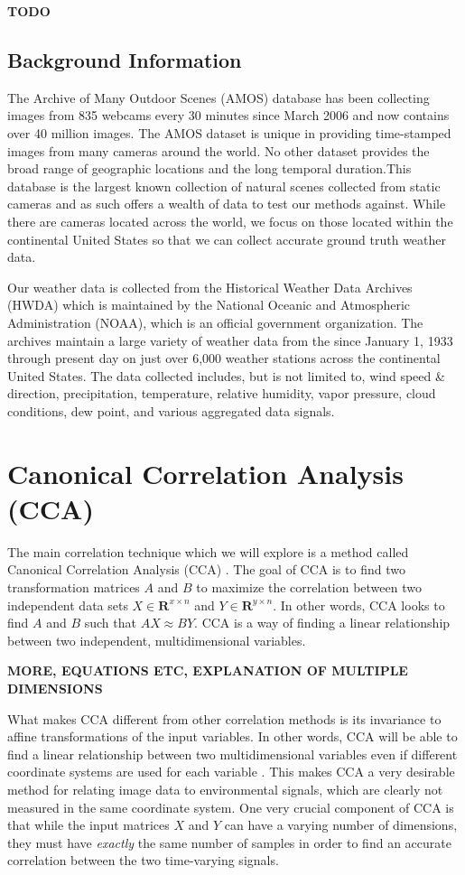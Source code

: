 \textbf{TODO}

\section{Background Information}
The Archive of Many Outdoor Scenes (AMOS) database \cite{jacobs07amos} has been collecting images from 835 webcams every 30 minutes since March 2006 and now contains over 40 million images. The AMOS dataset is unique in providing time-stamped images from many cameras around the world. No other dataset provides the broad range of geographic locations and the long temporal duration.This database is the largest known collection of natural scenes collected from static cameras and as such offers a wealth of data to test our methods against. While there are cameras located across the world, we focus on those located within the continental United States so that we can collect accurate ground truth weather data.

Our weather data is collected from the Historical Weather Data Archives (HWDA) \cite{noaa} which is maintained by the National Oceanic and Atmospheric Administration (NOAA), which is an official government organization. The archives maintain a large variety of weather data from the since January 1, 1933 through present day on just over 6,000 weather stations across the continental United States. The data collected includes, but is not limited to, wind speed \& direction, precipitation, temperature, relative humidity, vapor pressure, cloud conditions, dew point, and various aggregated data signals.

\chapter{Canonical Correlation Analysis (CCA)}
\label{cpt:cca}
The main correlation technique which we will explore is a method called Canonical Correlation Analysis (CCA) \cite{hotelling}. The goal of CCA is to find two transformation matrices $A$ and $B$ to maximize the correlation between two independent data sets $X \in \mathbf{R}^{x\times n}$ and $Y \in \mathbf{R}^{y\times n}$. In other words, CCA looks to find $A$ and $B$ such that $AX\approx BY$. CCA is a way of finding a linear relationship between two independent, multidimensional variables.

\textbf{MORE, EQUATIONS ETC, EXPLANATION OF MULTIPLE DIMENSIONS}

What makes CCA different from other correlation methods is its invariance to affine transformations of the input variables. In other words, CCA will be able to find a linear relationship between two multidimensional variables even if different coordinate systems are used for each variable \cite{bkl97}. This makes CCA a very desirable method for relating image data to environmental signals, which are clearly not measured in the same coordinate system. One very crucial component of CCA is that while the input matrices $X$ and $Y$ can have a varying number of dimensions, they must have \textit{exactly} the same number of samples in order to find an accurate correlation between the two time-varying signals.

